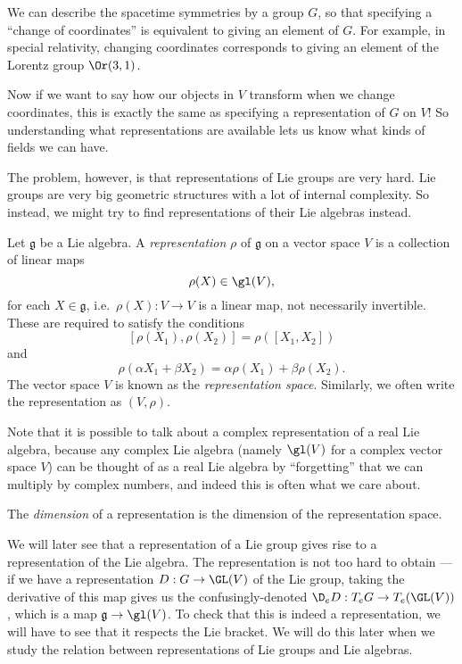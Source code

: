 \documentclass[a4paper]{article}
\begin{document}
We can describe the spacetime symmetries by a group $G$, so that specifying a ``change of coordinates'' is equivalent to giving an element of $G$. For example, in special relativity, changing coordinates corresponds to giving an element of the Lorentz group $\Or(3, 1)$.

Now if we want to say how our objects in $V$ transform when we change coordinates, this is exactly the same as specifying a representation of $G$ on $V$! So understanding what representations are available lets us know what kinds of fields we can have.

The problem, however, is that representations of Lie groups are very hard. Lie groups are very big geometric structures with a lot of internal complexity. So instead, we might try to find representations of their Lie algebras instead.
\begin{defi}
  Let $\mathfrak{g}$ be a Lie algebra. A \emph{representation} $\rho$ of $\mathfrak{g}$ on a vector space $V$ is a collection of linear maps
  \[
    \rho(X) \in \gl(V),
  \]
  for each $X \in \mathfrak{g}$, i.e.\ $\rho(X): V \to V$ is a linear map, not necessarily invertible. These are required to satisfy the conditions
  \[
    [\rho(X_1), \rho(X_2)] = \rho([X_1, X_2])
  \]
  and
  \[
    \rho(\alpha X_1 + \beta X_2) = \alpha \rho(X_1) + \beta \rho(X_2).
  \]
  The vector space $V$ is known as the \emph{representation space}. Similarly, we often write the representation as $(V, \rho)$.
\end{defi}
Note that it is possible to talk about a complex representation of a real Lie algebra, because any complex Lie algebra (namely $\gl(V)$ for a complex vector space $V$) can be thought of as a real Lie algebra by ``forgetting'' that we can multiply by complex numbers, and indeed this is often what we care about.

\begin{defi}
  The \emph{dimension} of a representation is the dimension of the representation space.
\end{defi}

We will later see that a representation of a Lie group gives rise to a representation of the Lie algebra. The representation is not too hard to obtain --- if we have a representation $D: G \to \GL(V)$ of the Lie group, taking the derivative of this map gives us the confusingly-denoted $\D_e D: T_e G \to T_e (\GL(V))$, which is a map $\mathfrak{g} \to \gl(V)$. To check that this is indeed a representation, we will have to see that it respects the Lie bracket. We will do this later when we study the relation between representations of Lie groups and Lie algebras.
\end{document}
